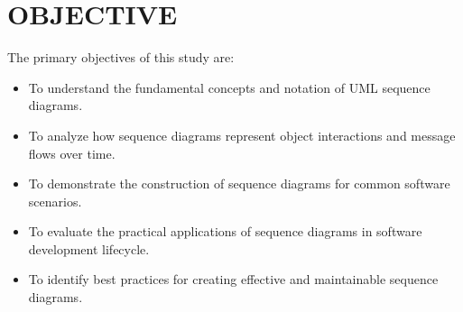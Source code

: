 \chapter{OBJECTIVE}\label{obj}

The primary objectives of this study are:

\begin{itemize}
    \item To understand the fundamental concepts and notation of UML sequence diagrams.
    \item To analyze how sequence diagrams represent object interactions and message flows over time.
    \item To demonstrate the construction of sequence diagrams for common software scenarios.
    \item To evaluate the practical applications of sequence diagrams in software development lifecycle.
    \item To identify best practices for creating effective and maintainable sequence diagrams.
\end{itemize}

















